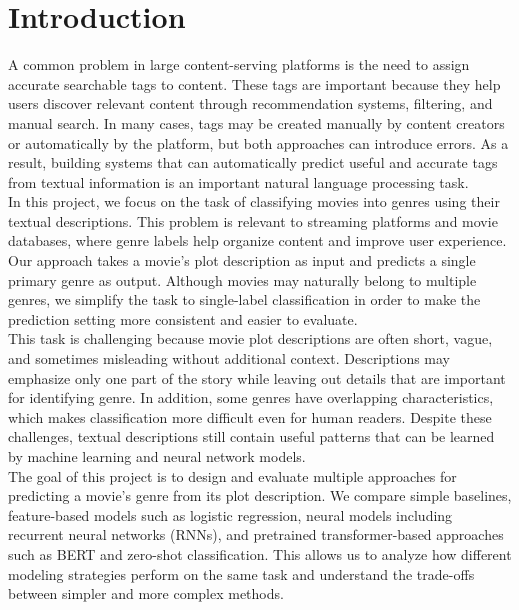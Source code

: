\section{Introduction}

A common problem in large content-serving platforms is the need to assign accurate searchable tags to content. These tags are important because they help users discover relevant content through recommendation systems, filtering, and manual search. In many cases, tags may be created manually by content creators or automatically by the platform, but both approaches can introduce errors. As a result, building systems that can automatically predict useful and accurate tags from textual information is an important natural language processing task. \\

In this project, we focus on the task of classifying movies into genres using their textual descriptions. This problem is relevant to streaming platforms and movie databases, where genre labels help organize content and improve user experience. Our approach takes a movie's plot description as input and predicts a single primary genre as output. Although movies may naturally belong to multiple genres, we simplify the task to single-label classification in order to make the prediction setting more consistent and easier to evaluate.\\

This task is challenging because movie plot descriptions are often short, vague, and sometimes misleading without additional context. Descriptions may emphasize only one part of the story while leaving out details that are important for identifying genre. In addition, some genres have overlapping characteristics, which makes classification more difficult even for human readers. Despite these challenges, textual descriptions still contain useful patterns that can be learned by machine learning and neural network models.\\

The goal of this project is to design and evaluate multiple approaches for predicting a movie's genre from its plot description. We compare simple baselines, feature-based models such as logistic regression, neural models including recurrent neural networks (RNNs), and pretrained transformer-based approaches such as BERT and zero-shot classification. This allows us to analyze how different modeling strategies perform on the same task and understand the trade-offs between simpler and more complex methods.
